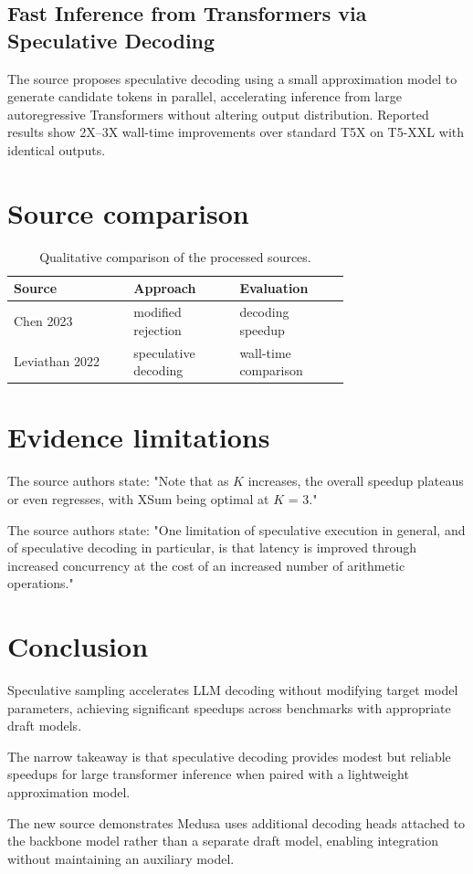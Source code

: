 \documentclass[conference]{IEEEtran}
\begin{document}
\subsection{Fast Inference from Transformers via Speculative Decoding}
The source proposes speculative decoding using a small approximation model to generate candidate tokens in parallel, accelerating inference from large autoregressive Transformers without altering output distribution. Reported results show 2X–3X wall-time improvements over standard T5X on T5-XXL with identical outputs. \cite{leviathan2022fast}

\section{Source comparison}
\begin{table}[H]\centering
\begin{tabular}{|>{\raggedright\arraybackslash}p{0.26\linewidth}|>{\raggedright\arraybackslash}p{0.235\linewidth}|>{\raggedright\arraybackslash}p{0.235\linewidth}|}\hline
Source & Approach & Evaluation \\ \hline
Chen 2023 \cite{chen2023accelerating} & modified rejection & decoding speedup \\ \hline
Leviathan 2022 \cite{leviathan2022fast} & speculative decoding & wall-time comparison \\ \hline
\end{tabular}\caption{Qualitative comparison of the processed sources.}\end{table}
\section{Evidence limitations}
The source authors state: "Note that as \ensuremath{\mathit{K}}
increases, the overall speedup plateaus or even regresses, with XSum being optimal at \ensuremath{\mathit{K}} = 3." \cite{chen2023accelerating}

The source authors state: "One limitation of speculative execution in general, and of
speculative decoding in particular, is that latency is improved through increased concurrency at the cost of an increased number of arithmetic operations." \cite{leviathan2022fast}

\section{Conclusion}
Speculative sampling accelerates LLM decoding without modifying target model parameters, achieving significant speedups across benchmarks with appropriate draft models. \cite{chen2023accelerating}

The narrow takeaway is that speculative decoding provides modest but reliable speedups for large transformer inference when paired with a lightweight approximation model. \cite{leviathan2022fast}

The new source demonstrates Medusa uses additional decoding heads attached to the backbone model rather than a separate draft model, enabling integration without maintaining an auxiliary model. \cite{cai2024medusa}



\end{document}
